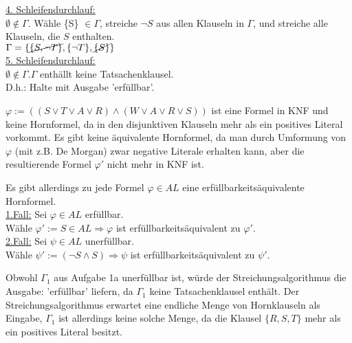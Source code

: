 \documentclass[a4paper,10pt]{article}
\begin{document}
\begin{compactenum} [(a)]
		\underline{4. Schleifendurchlauf: }\\
		$ \emptyset \not\in \Gamma. $ Wähle \{S\} $ \in \Gamma $, streiche $ \lnot S $ aus allen Klauseln in $ \Gamma $, und streiche alle Klauseln, die $ S $ enthalten.\\
		$ \Gamma = \{\cancel{\{S,\lnot T\}}, \{\lnot T\}, \cancel{\{S\}} \} $\\
		
		\underline{5. Schleifendurchlauf: }\\
		$ \emptyset \not\in \Gamma. \Gamma $ enthällt keine Tatsachenklausel.\\
		D.h.: Halte mit Ausgabe 'erfüllbar'.\\
		
		\item \begin{compactenum} [(i)]
			\item $ \varphi := ((S\vee T\vee A \vee R)\wedge (W\vee A \vee R\vee S)) $ ist eine Formel in KNF und keine Hornformel, da in den disjunktiven Klauseln mehr als ein positives Literal vorkommt. Es gibt keine äquivalente Hornformel, da man durch Umformung von $ \varphi $ (mit z.B. De Morgan) zwar negative Literale erhalten kann, aber die resultierende Formel $ \varphi' $ nicht mehr in KNF ist. 
			\item Es gibt allerdings zu jede Formel $\varphi \in AL $ eine erfüllbarkeitsäquivalente Hornformel.\\
			\underline{1.Fall:} Sei $ \varphi \in AL $ erfüllbar. \\
			Wähle $ \varphi' := S \in AL \Rightarrow \varphi$ ist  erfüllbarkeitsäquivalent zu $ \varphi' $. \\
			\underline{2.Fall:} Sei $ \psi \in AL $ unerfüllbar. \\
			Wähle $ \psi' := (\lnot S \wedge S) \Rightarrow \psi$ ist  erfüllbarkeitsäquivalent zu $ \psi' $. \\
		\end{compactenum}
		
		\item Obwohl $ \Gamma_1 $ aus Aufgabe 1a unerfüllbar ist, würde der Streichungsalgorithmus die Ausgabe: 'erfüllbar' liefern, da $ \Gamma_1 $ keine Tatsachenklausel enthält. Der Streichungsalgorithmus erwartet eine endliche Menge von Hornklauseln als Eingabe, $ \Gamma_1 $ ist allerdings keine solche Menge, da die Klausel $ \{R,S,T\} $ mehr als ein positives Literal besitzt. 
	\end{compactenum}\ \\
\end{document}
